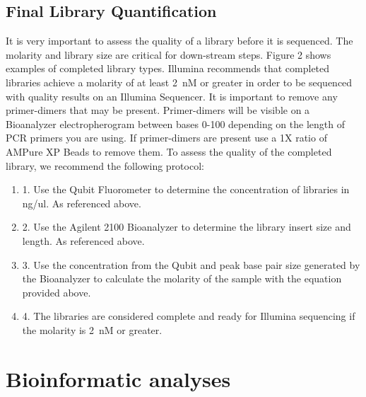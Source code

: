 \documentclass[graybox]{svmult}
\begin{document}
\subsection{Final Library Quantification}

It is very important to assess the quality of a library before it is sequenced. The molarity and library size are critical for down-stream steps. Figure 2 shows examples of completed library types. Illumina recommends that completed libraries achieve a molarity of at least 2~nM or greater in order to be sequenced with quality results on an Illumina Sequencer. It is important to remove any primer-dimers that may be present. Primer-dimers will be visible on a Bioanalyzer electropherogram between bases 0-100 depending on the length of PCR primers you are using. If primer-dimers are present use a 1X ratio of AMPure XP Beads to remove them. To assess the quality of the completed library, we recommend the following protocol:
\begin{enumerate}
\item{1.      Use the Qubit Fluorometer to determine the concentration of libraries in ng/ul. As referenced above.}
\item{2.      Use the Agilent 2100 Bioanalyzer to determine the library insert size and length. As referenced above.}
\item{3.      Use the concentration from the Qubit and peak base pair size generated by the Bioanalyzer to calculate the molarity of the sample with the equation provided above.}
\item{4.      The libraries are considered complete and ready for Illumina sequencing if the molarity is 2~nM or greater.}
\end{enumerate}

\section{Bioinformatic analyses}
\label{sec:4}
\end{document}
